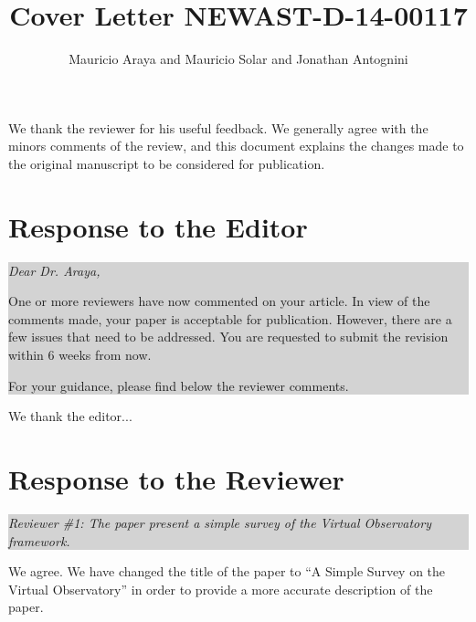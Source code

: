 \documentclass[a4paper]{article}
\title{Cover Letter NEWAST-D-14-00117}
\author{Mauricio Araya and Mauricio Solar and Jonathan Antognini}
\newcommand{\quoting}[1]{
  
  
  \colorbox{lightgray}{
    \begin{minipage}{0.98\linewidth}
      \em #1
    \end{minipage}
  }
  
  
}
\begin{document}
\maketitle


We thank the reviewer for his useful feedback. We generally agree
with the minors comments of the review, and this document 
explains the changes made to the original manuscript to be 
considered for publication.

\section{Response to the Editor}

\quoting{
Dear Dr. Araya,

One or more reviewers have now commented on your article. In view of the
comments made, your paper is acceptable for publication. However, there are a
few issues that need to be addressed.
You are requested to submit the revision within 6 weeks from now.

For your guidance, please find below the reviewer comments.
}

We thank the editor...

\section{Response to the Reviewer}

\quoting{
Reviewer \#1: The paper present a simple survey of the Virtual Observatory
framework. 
}

We agree. We have changed the title of
the paper to ``A Simple Survey on the Virtual Observatory'' in order to provide
a more accurate description of the paper.
\end{document}

